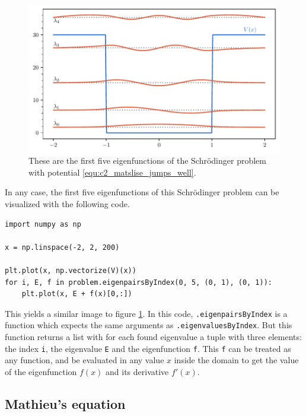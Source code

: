 \begin{figure}
    \begin{center}
        \includegraphics[width=\textwidth]{img/chapter2/matslise_jumps_eigenfunctions.pdf}
    \end{center}
    \caption{These are the first five eigenfunctions of the Schrödinger problem with potential \eqref{equ:c2_matslise_jumps_well}.}
    \label{fig:c2_matslise_jumps_eigenfunctions}
\end{figure}

In any case, the first five eigenfunctions of this Schrödinger problem can be visualized with the following code.
\begin{verbatim}
import numpy as np

x = np.linspace(-2, 2, 200)

plt.plot(x, np.vectorize(V)(x))
for i, E, f in problem.eigenpairsByIndex(0, 5, (0, 1), (0, 1)):
    plt.plot(x, E + f(x)[0,:])
\end{verbatim}
This yields a similar image to figure \ref{fig:c2_matslise_jumps_eigenfunctions}. In this code, \texttt{.eigenpairsByIndex} is a function which expects the same arguments as \texttt{.eigenvaluesByIndex}. But this function returns a list with for each found eigenvalue a tuple with three elements: the index \texttt{i}, the eigenvalue \texttt{E} and the eigenfunction \texttt{f}. This \texttt{f} can be treated as any \lpython{} function, and be evaluated in any value $x$ inside the domain to get the value of the eigenfunction $f(x)$ and its derivative $f'(x)$.

\subsection{Mathieu's equation}\label{sec:c2_numerical_experiments_mathieu}

